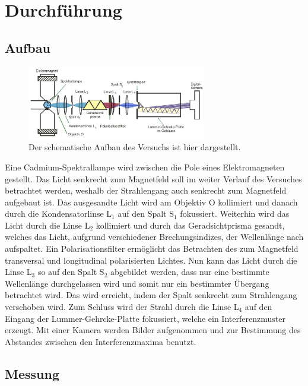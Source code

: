 \section{Durchführung}
\label{sec:Durchfuehrung}
\subsection{Aufbau}
    \begin{figure}[h]
        \center
        \includegraphics[width=0.7\textwidth]{bilder/aufbau.jpeg}
        \caption{Der schematische Aufbau des Versuchs ist hier dargestellt. \cite{anleitung}}
        \label{fig:aufbau}
    \end{figure}
    \FloatBarrier

    Eine Cadmium-Spektrallampe wird zwischen die Pole eines Elektromagneten gestellt.
    Das Licht senkrecht zum Magnetfeld soll im weiter Verlauf des Versuches betrachtet werden, weshalb der Strahlengang auch senkrecht zum Magnetfeld aufgebaut ist.
    Das ausgesandte Licht wird am Objektiv O kollimiert und danach durch die Kondensatorlinse L$_1$ auf den Spalt S$_1$ fokussiert.
    Weiterhin wird das Licht durch die Linse L$_2$ kollimiert und durch das Geradsichtprisma gesandt, welches das Licht, aufgrund verschiedener Brechungsindizes, der Wellenlänge nach aufspaltet.
    Ein Polarisationsfilter ermöglicht das Betrachten des zum Magnetfeld transversal und longitudinal polarisierten Lichtes.
    Nun kann das Licht durch die Linse L$_3$ so auf den Spalt S$_2$ abgebildet werden, dass nur eine bestimmte Wellenlänge durchgelassen wird und somit nur ein bestimmter Übergang betrachtet wird.
    Das wird erreicht, indem der Spalt senkrecht zum Strahlengang verschoben wird.
    Zum Schluss wird der Strahl durch die Linse L$_4$ auf den Eingang der Lummer-Gehrcke-Platte fokussiert, welche ein Interferenzmuster erzeugt.
    Mit einer Kamera werden Bilder aufgenommen und zur Bestimmung des Abstandes zwischen den Interferenzmaxima benutzt.

\subsection{Messung}
